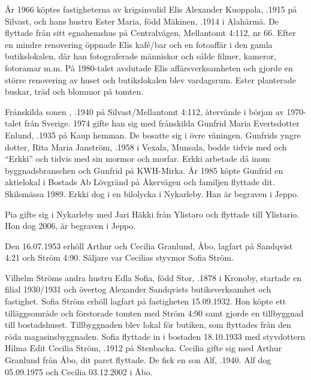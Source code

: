 %
År 1966 köptes fastigheterna av krigsinvalid Elis Alexander Kuoppala,	.1915 på Silvast, och hans hustru Ester Maria, född Mäkinen, .1914 i	Alahärmä. De flyttade från sitt egnahemshus på Centralvägen, Mellantomt 4:112, nr 66. Efter en mindre renovering öppnade Elis kafé/bar och en fotoaffär i den gamla butikslokalen, där han fotograferade människor och sålde filmer, kameror, fotoramar m.m. På 1980-talet avslutade Elis affärsverksamheten och gjorde en större renovering av huset och butikslokalen blev vardagsrum. Ester planterade buskar, träd och blommor på tomten.

Frånskilda sonen , .1940 på Silvast/Mellantomt 4:112, återvände i början av 1970-talet från Sverige. 1974 gifte han sig med frånskilda Gunfrid Maria Evertsdotter Enlund, .1935 på Kaup hemman. De bosatte sig i övre våningen. Gunfrids yngre dotter, Rita Maria Janström, .1958 i Vexala, Munsala, bodde tidvis med  och ``Erkki'' och tidvis med sin mormor och morfar. Erkki arbetade då inom byggnadsbranschen och Gunfrid på KWH-Mirka. År 1985 köpte Gunfrid en aktielokal i Bostads Ab Lövgränd på Åkervägen och familjen flyttade dit. Skilsmässa 1989. Erkki dog i en bilolycka i Nykarleby. Han är begraven i Jeppo.
\begin{jhchildren}
  \item {}
\end{jhchildren}
Pia gifte sig i Nykarleby med Jari Häkki från Ylistaro och flyttade till Ylistario. Hon dog 2006, är begraven i Jeppo.


%
Den 16.07.1953 erhöll Arthur och Cecilia Granlund, Åbo, lagfart	på Sandqvist 4:21 och Ström 4:90. Säljare var Cecilias styvmor Sofia Ström.\jhvspace{}


%
Vilhelm Ströms andra hustru Edla Sofia, född Stor, .1878 i Kronoby, startade en filial 1930/1931 och övertog Alexander Sandqvists butiksverksamhet och fastighet. Sofia Ström erhöll lagfart på fastigheten 15.09.1932. Hon köpte ett tilläggsområde och förstorade tomten med Ström 4:90 samt gjorde en tillbyggnad till bostadshuset. Tillbyggnaden blev lokal för butiken, som flyttades från den röda magasinsbyggnaden. Sofia flyttade in i bostaden 18.10.1933 med styvdottern Hilma Edit Cecilia Ström, .1912 på Stenbacka. Cecilia gifte sig med Arthur Granlund från Åbo, dit paret flyttade. De fick en son Alf, .1940. Alf dog 05.09.1975 och Cecilia 03.12.2002 i Åbo.

